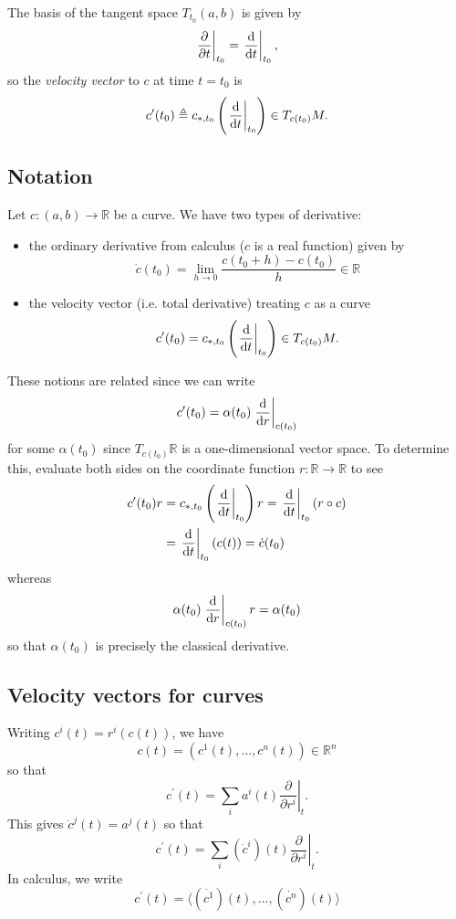 The basis of the tangent space $T_{t_0} (a, b)$ is given by
$$
  \left.\frac{\partial}{\partial t}\right|_{t_0}
= \left.\frac{\mathop{}\!\mathrm{d}}{\mathop{}\!\mathrm{d} t}\right|_{t_0},
$$
so the \emph{velocity vector} to $c$ at time $t = t_0$ is
$$
           c^\prime(t_0)
\triangleq c_{\ast, t_0}
             \left(
               \left.\frac{\mathop{}\!\mathrm{d}}{\mathop{}\!\mathrm{d} t}\right|_{t_0}
             \right)
\in T_{c(t_0)} M.
$$

\subsection{Notation}
Let $c: (a, b) \to \mathbb{R}$ be a curve. We have two types of
derivative:
\begin{itemize}
  \item{
    the ordinary derivative from calculus ($c$ is a real function) given by
    $$
      \dot{c}(t_0)
    = \lim_{h \to 0}
        \frac{c(t_0 + h) - c(t_0)}{h}
    \in \mathbb{R}
    $$
  }
  \item{
    the velocity vector (i.e. total derivative) treating $c$ as a
    curve
    $$
      c^\prime(t_0)
    = c_{\ast, t_0}
        \left(
          \left.\frac{\mathop{}\!\mathrm{d}}{\mathop{}\!\mathrm{d} t}\right|_{t_0}
        \right)
    \in T_{c(t_0)} M.
    $$
  }
\end{itemize}
These notions are related since we can write
$$
  c^\prime(t_0)
= \alpha(t_0)
  \left.\frac{\mathop{}\!\mathrm{d}}{\mathop{}\!\mathrm{d} r}\right|_{c(t_0)}
$$
for some $\alpha(t_0)$ since $T_{c(t_0)}\mathbb{R}$ is a
one-dimensional vector space.
To determine this, evaluate both sides on the coordinate function
$r: \mathbb{R} \to \mathbb{R}$ to see
\begin{align*}
   c^\prime(t_0) r
&= c_{\ast, t_0}
     \left(
       \left.\frac{\mathop{}\!\mathrm{d}}{\mathop{}\!\mathrm{d} t}\right|_{t_0}
     \right) r
 = \left.\frac{\mathop{}\!\mathrm{d}}{\mathop{}\!\mathrm{d} t}\right|_{t_0} (r \circ c) \\
&= \left.\frac{\mathop{}\!\mathrm{d}}{\mathop{}\!\mathrm{d} t}\right|_{t_0} (c(t))
 = \dot{c}(t_0)
\end{align*}
whereas
$$
  \alpha(t_0)
  \left.\frac{\mathop{}\!\mathrm{d}}{\mathop{}\!\mathrm{d} r}\right|_{c(t_0)} r
= \alpha(t_0)
$$
so that $\alpha(t_0)$ is precisely the classical derivative.

\subsection{Velocity vectors for curves}
Writing $c^i(t) = r^i(c(t))$, we have
$$
  c(t)
= (c^1(t), \dots, c^n(t)) \in \mathbb{R}^n
$$
so that
$$
  c^\prime(t)
= \sum_i
    a^i(t)
    \left.\frac{\partial}{\partial r^i}\right|_t.
$$
This gives $\dot{c}^j(t) = a^j(t)$ so that
$$
  c^\prime(t)
= \sum_i
    (\dot{c}^i)(t)
    \left.\frac{\partial}{\partial r^i}\right|_t.
$$
In calculus, we write
$$
  c^\prime(t)
= \langle
    (\dot{c^1})(t), \dots, (\dot{c^n})(t)
  \rangle
$$

